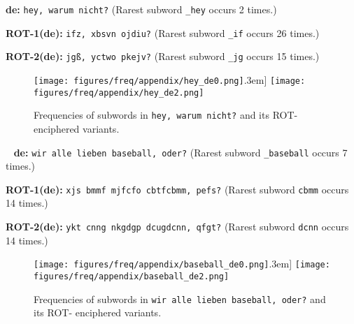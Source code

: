 \documentclass[11pt]{article}
\begin{document}
\noindent
\textbf{de:}
\texttt{hey, warum nicht?} (Rarest subword \texttt{\_hey} occurs 2 times.)

\noindent
\textbf{ROT-1(de):}
\texttt{ifz, xbsvn ojdiu?} (Rarest subword \texttt{\_if} occurs 26 times.)

\noindent
\textbf{ROT-2(de):}
\texttt{jgß, yctwo pkejv?} (Rarest subword \texttt{\_jg} occurs 15 times.)

\begin{figure}[hbt]
    \centering
    \texttt{[image: figures/freq/appendix/hey\_de0.png]}\0.3em]
    \texttt{[image: figures/freq/appendix/hey\_de2.png]}\\
\caption{Frequencies of subwords in \texttt{hey, warum nicht?} and its ROT- enciphered variants.}
\end{figure}

\
\noindent
\textbf{de:}
\texttt{wir alle lieben baseball, oder?} (Rarest subword \texttt{\_baseball} occurs 7 times.)

\noindent
\textbf{ROT-1(de):}
\texttt{xjs bmmf mjfcfo cbtfcbmm, pefs?} (Rarest subword \texttt{cbmm} occurs 14 times.)

\noindent
\textbf{ROT-2(de):}
\texttt{ykt cnng nkgdgp dcugdcnn, qfgt?} (Rarest subword \texttt{dcnn} occurs 14 times.)

\begin{figure}[!ht]
    \centering
    \texttt{[image: figures/freq/appendix/baseball\_de0.png]}\0.3em]
    \texttt{[image: figures/freq/appendix/baseball\_de2.png]}\\
\caption{Frequencies of subwords in \texttt{wir alle lieben baseball, oder?} and its ROT- enciphered variants.}
\end{figure}
\end{document}
